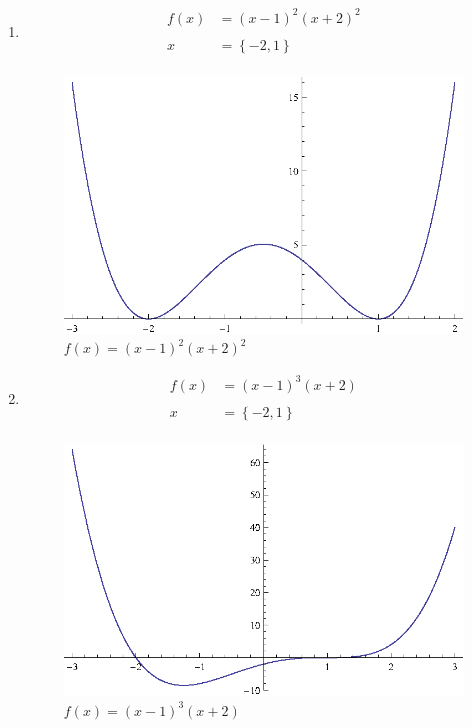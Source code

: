 \documentclass{article}
\begin{document}
\begin{enumerate}
  \item 
    \begin{align*}
      f(x) &= (x - 1)^2 (x + 2)^2 \\
      \\
      x    &= \left\{ -2, 1 \right\} \\
    \end{align*}
    
    \begin{figure}[H]
      \centering
      \includegraphics[scale=0.9]{graph9.eps}
      \caption*{$f(x) = (x - 1)^2 (x + 2)^2$}
    \end{figure}

  \item 
    \begin{align*}
      f(x) &= (x - 1)^3 (x + 2) \\
      \\
      x    &= \left\{ -2, 1 \right\} \\
    \end{align*}
    
    \begin{figure}[H]
      \centering
      \includegraphics[scale=0.9]{graph11.eps}
      \caption*{$f(x) = (x - 1)^3 (x + 2)$}
    \end{figure}



\end{enumerate}
\end{document}
